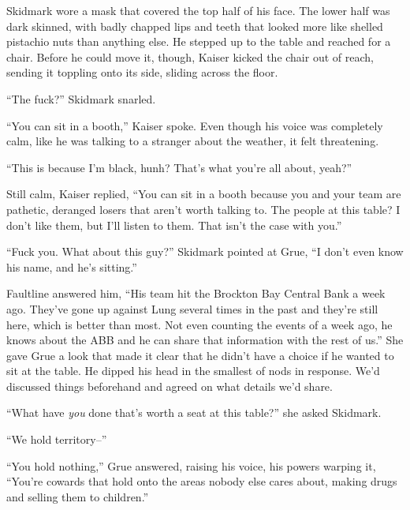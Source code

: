 Skidmark wore a mask that covered the top half of his face.  The lower half was dark skinned, with badly chapped lips and teeth that looked more like shelled pistachio nuts than anything else.  He stepped up to the table and reached for a chair.  Before he could move it, though, Kaiser kicked the chair out of reach, sending it toppling onto its side, sliding across the floor.



``The fuck?'' Skidmark snarled.



``You can sit in a booth,'' Kaiser spoke.  Even though his voice was completely calm, like he was talking to a stranger about the weather, it felt threatening.



``This is because I'm black, hunh?  That's what you're all about, yeah?''



Still calm, Kaiser replied, ``You can sit in a booth because you and your team are pathetic, deranged losers that aren't worth talking to.  The people at this table?  I don't like them, but I'll listen to them.  That isn't the case with you.''



``Fuck you.  What about this guy?'' Skidmark pointed at Grue, ``I don't even know his name, and he's sitting.''



Faultline answered him, ``His team hit the Brockton Bay Central Bank a week ago.  They've gone up against Lung several times in the past and they're still here, which is better than most.  Not even counting the events of a week ago, he knows about the ABB and he can share that information with the rest of us.''  She gave Grue a look that made it clear that he didn't have a choice if he wanted to sit at the table.  He dipped his head in the smallest of nods in response.  We'd discussed things beforehand and agreed on what details we'd share.



``What have \emph{you} done that's worth a seat at this table?'' she asked Skidmark.



``We hold territory--''



``You hold nothing,'' Grue answered, raising his voice, his powers warping it, ``You're cowards that hold onto the areas nobody else cares about, making drugs and selling them to children.''




